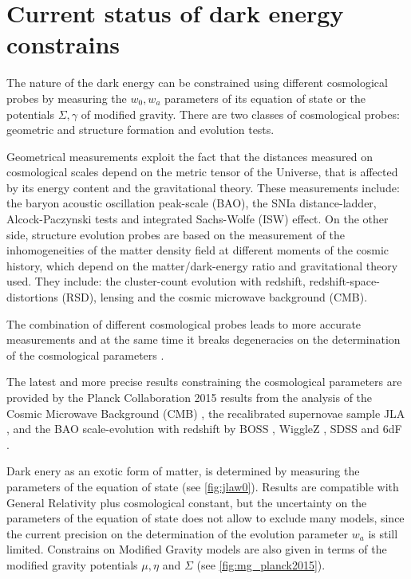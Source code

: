 \section{Current status of dark energy constrains}
The nature of the dark energy can be constrained using different cosmological probes \cite{Weinberg201387} by measuring the $w_0,w_a$ parameters of its equation of state or the potentials $\Sigma,\gamma$ of modified gravity. There are two classes of cosmological probes: geometric and structure formation and evolution tests.
\newline

Geometrical measurements exploit the fact that the distances measured on cosmological scales depend on the metric tensor of the Universe, that is affected by its energy content and the gravitational theory. These measurements include: the baryon acoustic oscillation peak-scale (BAO), the SNIa distance-ladder, Alcock-Paczynski \cite{1979Natur.281..358A} tests and integrated Sachs-Wolfe (ISW) effect. On the other side, structure evolution probes are based on the measurement of the inhomogeneities of the matter density field at different moments of the cosmic history, which depend on the matter/dark-energy ratio and gravitational theory used. They include: the cluster-count evolution with redshift, redshift-space-distortions (RSD), lensing and the cosmic microwave background (CMB).
\newline

The combination of different cosmological probes leads to more accurate measurements and at the same time it breaks degeneracies on the determination of the cosmological parameters \cite{2006A&A...448..831Y,Weinberg201387}.
\newline

The latest and more precise results constraining the cosmological parameters are provided by the Planck Collaboration 2015 results from the analysis of the Cosmic Microwave Background (CMB) \cite{2016A&A...594A..14P}, the recalibrated supernovae sample JLA \cite{2014A&A...568A..22B}, and the BAO scale-evolution with redshift by BOSS \cite{Ata:2017dya}, WiggleZ \cite{2014MNRAS.441.3524K}, SDSS \cite{2015MNRAS.449..835R} and 6dF \cite{2011MNRAS.416.3017B}.
\newline

Dark enery as an exotic form of matter, is determined by measuring the parameters of the equation of state (see \autoref{fig:jlaw0}). Results are compatible with General Relativity plus cosmological constant, but the uncertainty on the parameters of the equation of state does not allow to exclude many models, since the current precision on the determination of the evolution parameter $w_a$ is still limited. Constrains on Modified Gravity models are also given in terms of the modified gravity potentials $\mu,\eta$ and $\Sigma$ (see \autoref{fig:mg_planck2015}).
\newline

